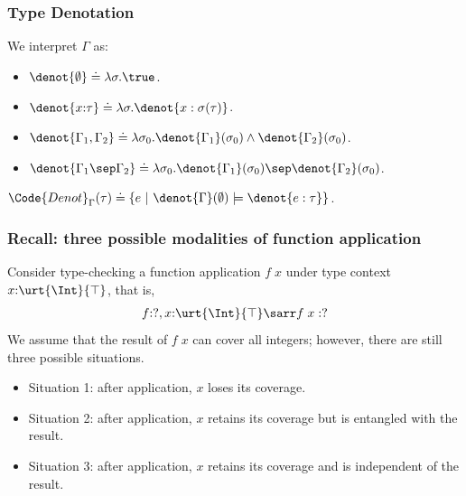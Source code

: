 \begin{frame}[fragile]
    \frametitle{Type Denotation}

\begin{definition} We interpret $\Gamma$ as:
\begin{itemize}
    \item $\denot{\emptyset} \doteq \lambda \sigma. \true$.
    \item $\denot{x{:}\tau} \doteq \lambda \sigma.\denot{x : \sigma(\tau)} $.
    \item $\denot{\Gamma_1, \Gamma_2} \doteq \lambda \sigma_0. \denot{\Gamma_1}(\sigma_0) \land \denot{\Gamma_2} (\sigma_0) $.
    \item $\denot{\Gamma_1 \sep \Gamma_2} \doteq \lambda \sigma_0. \denot{\Gamma_1}(\sigma_0) \sep \denot{\Gamma_2} (\sigma_0) $.
\end{itemize}
\end{definition}

\begin{definition} $\Code{Denot}_\Gamma(\tau) \doteq \{e ~|~ \denot{\Gamma}(\emptyset) \models \denot{e : \tau} \}$.
\end{definition}

\end{frame}

\begin{frame}[fragile]
    \frametitle{Recall: three possible modalities of function application}
Consider type-checking a function application $f\;x$ under type context $x{:}\urt{\Int}{\top}$, that is,
\begin{align*}
    f{:}?, x{:}\urt{\Int}{\top} \sarr f\;x : ?
\end{align*}\noindent
We assume that the result of $f\;x$ can cover all integers; however, there are still three possible situations.
\begin{itemize}
    \item Situation 1: after application, $x$ loses its coverage.
    \item Situation 2: after application, $x$ retains its coverage but is entangled with the result.
    \item Situation 3: after application, $x$ retains its coverage and is independent of the result.
\end{itemize}

\end{frame}

